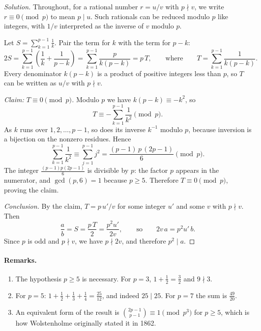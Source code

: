 \documentclass[11pt]{article}
\theoremstyle{problemstyle}
\theoremstyle{plain}
\newenvironment{solution}{\begin{proof}[Solution]}{\end{proof}}
\begin{document}
\begin{solution}
Throughout, for a rational number $r = u/v$ with $p \nmid v$, we write $r \equiv 0 \pmod p$ to mean $p \mid u$. Such rationals can be reduced modulo $p$ like integers, with $1/v$ interpreted as the inverse of $v$ modulo $p$.

Let $S = \sum_{k=1}^{p-1} \frac{1}{k}$. Pair the term for $k$ with the term for $p - k$:
\[
  2S = \sum_{k=1}^{p-1} \left( \frac{1}{k} + \frac{1}{p - k} \right) = \sum_{k=1}^{p-1} \frac{p}{k(p - k)} = p\,T,
  \qquad\text{where}\qquad
  T = \sum_{k=1}^{p-1} \frac{1}{k(p - k)}.
\]
Every denominator $k(p - k)$ is a product of positive integers less than $p$, so $T$ can be written as $u/v$ with $p \nmid v$.

\emph{Claim: $T \equiv 0 \pmod p$.} Modulo $p$ we have $k(p - k) \equiv -k^2$, so
\[
  T \equiv -\sum_{k=1}^{p-1} \frac{1}{k^2} \pmod p.
\]
As $k$ runs over $1, 2, \dots, p - 1$, so does its inverse $k^{-1}$ modulo $p$, because inversion is a bijection on the nonzero residues. Hence
\[
  \sum_{k=1}^{p-1} \frac{1}{k^2} \equiv \sum_{j=1}^{p-1} j^2 = \frac{(p - 1)\,p\,(2p - 1)}{6} \pmod p.
\]
The integer $\frac{(p-1)p(2p-1)}{6}$ is divisible by $p$: the factor $p$ appears in the numerator, and $\gcd(p, 6) = 1$ because $p \ge 5$. Therefore $T \equiv 0 \pmod p$, proving the claim.

\emph{Conclusion.} By the claim, $T = p\,u'/v$ for some integer $u'$ and some $v$ with $p \nmid v$. Then
\[
  \frac{a}{b} = S = \frac{p\,T}{2} = \frac{p^2 u'}{2v},
  \qquad\text{so}\qquad
  2v\,a = p^2 u'\, b.
\]
Since $p$ is odd and $p \nmid v$, we have $p \nmid 2v$, and therefore $p^2 \mid a$.
\end{solution}

\paragraph{Remarks.}
\begin{enumerate}[label=(\arabic*)]
  \item The hypothesis $p \ge 5$ is necessary. For $p = 3$, $1 + \frac12 = \frac32$ and $9 \nmid 3$.
  \item For $p = 5$: $1 + \frac12 + \frac13 + \frac14 = \frac{25}{12}$, and indeed $25 \mid 25$. For $p = 7$ the sum is $\frac{49}{20}$.
  \item An equivalent form of the result is $\binom{2p-1}{p-1} \equiv 1 \pmod{p^3}$ for $p \ge 5$, which is how Wolstenholme originally stated it in 1862.
\end{enumerate}
\end{document}
